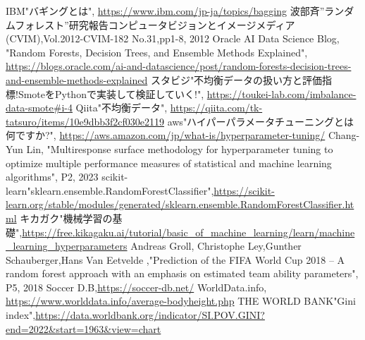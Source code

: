 \documentclass[platex]{suribt}
\begin{document}
\begin{thebibliography}{2}
\bibitem{}
IBM"バギングとは", \url{https://www.ibm.com/jp-ja/topics/bagging}
\bibitem{}
波部斉”ランダムフォレスト”研究報告コンピュータビジョンとイメージメディア(CVIM),Vol.2012-CVIM-182 No.31,pp1-8, 2012
\bibitem{}
Oracle AI Data Science Blog, "Random Forests, Decision Trees, and Ensemble Methods Explained",  \url{https://blogs.oracle.com/ai-and-datascience/post/random-forests-decision-trees-and-ensemble-methods-explained}
\bibitem{}
スタビジ"不均衡データの扱い方と評価指標!SmoteをPythonで実装して検証していく!", \url{https://toukei-lab.com/imbalance-data-smote#i-4}
\bibitem{}
Qiita"不均衡データ", \url{https://qiita.com/tk-tatsuro/items/10e9dbb3f2cf030e2119}
\bibitem{}
aws"ハイパーパラメータチューニングとは何ですか?", \url{https://aws.amazon.com/jp/what-is/hyperparameter-tuning/}
\bibitem{}
Chang-Yun Lin, "Multiresponse surface methodology for hyperparameter tuning to optimize multiple performance measures of statistical and machine learning algorithms", P2, 2023
\bibitem{}
scikit-learn"sklearn.ensemble.RandomForestClassifier",\url{https://scikit-learn.org/stable/modules/generated/sklearn.ensemble.RandomForestClassifier.html}
\bibitem{}
キカガク"機械学習の基礎",\url{https://free.kikagaku.ai/tutorial/basic_of_machine_learning/learn/machine_learning_hyperparameters}
\bibitem{}
Andreas Groll, Christophe Ley,Gunther Schauberger,Hans Van Eetvelde ,"Prediction of the FIFA World Cup 2018 – A random forest approach with an emphasis on estimated team ability parameters", P5, 2018
\bibitem{}
Soccer D.B,\url{https://soccer-db.net/}
\bibitem{}
WorldData.info, \url{https://www.worlddata.info/average-bodyheight.php}
\bibitem{}
THE WORLD BANK"Gini index",\url{https://data.worldbank.org/indicator/SI.POV.GINI?end=2022&start=1963&view=chart}

\end{thebibliography}
\end{document}
